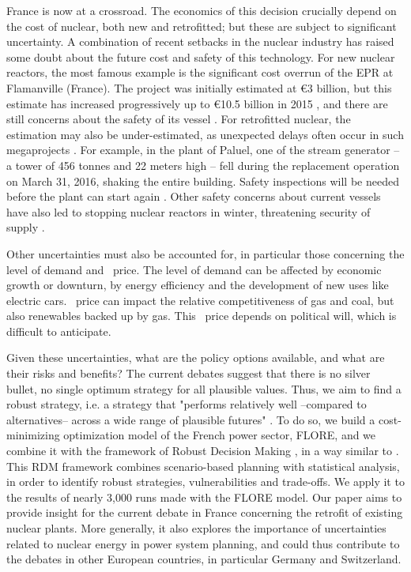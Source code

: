 France is now at a crossroad. The economics of this decision crucially depend on the cost of nuclear, both new and retrofitted; but these are subject to significant uncertainty. A combination of recent setbacks in the nuclear industry has raised some doubt about the future cost and safety of this technology.
For new nuclear reactors, the most famous example is the significant cost overrun of the EPR at Flamanville (France). The project was initially estimated at \euro 3 billion, but this estimate has increased progressively up to \euro 10.5 billion in 2015 \citep{Garric2015}, and there are still concerns about the safety of its vessel \citep{Hir2015}. For retrofitted nuclear, the estimation may also be under-estimated, as unexpected delays often occur in such megaprojects \citep{Kahneman2012}. For example, in the plant of Paluel, one of the stream generator -- a tower of 456 tonnes and 22 meters high -- fell during the replacement operation on March 31, 2016, shaking the entire building.  Safety inspections will be needed before the plant can start again \citep{ASN2016}. Other safety concerns about current vessels have also led to stopping nuclear reactors in winter, threatening security of supply \citep{Monicault2016}.

Other uncertainties must also be accounted for, in particular those concerning the level of demand and \coo\ price. The level of demand can be affected by economic growth or downturn, by energy efficiency and the development of new uses like electric cars. \coo\ price can impact the relative competitiveness of gas and coal, but also renewables backed up by gas. This \coo\ price depends on political will, which is difficult to anticipate.

Given these uncertainties, what are the policy options available, and what are their risks and benefits? 
The current debates suggest that there is no silver bullet, no single optimum strategy for all plausible values. Thus, we aim to find a robust strategy, i.e. a strategy that "performs relatively well --compared to alternatives-- across a wide range of plausible futures" \citep{Lempert2006}. 
To do so, we build a cost-minimizing optimization model of the French power sector, FLORE, and we combine it with the framework of Robust Decision Making \citep{Lempert2006}, in a way similar to \citet{Nahmmacher2016}. This RDM framework combines scenario-based planning with statistical analysis, in order to identify robust strategies, vulnerabilities and trade-offs. We apply it to the results of nearly 3,000 runs made with the FLORE model. 
Our paper aims to provide insight for the current debate in France concerning the retrofit of existing nuclear plants. More generally, it also explores the importance of uncertainties related to nuclear energy in power system planning, and could thus contribute to the debates in other European countries, in particular Germany and Switzerland.

